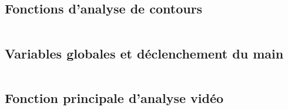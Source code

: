 \documentclass[12pt,a4paper,fleqn]{article}
\begin{document}
\subsection{Fonctions d'analyse de contours}
\inputminted[firstline=1,lastline=142]{python}{../find_ball_v6.py}
\subsection{Variables globales et déclenchement du main}
\inputminted[firstline=285,lastline=295]{python}{../find_ball_v6.py}
\newpage
\subsection{Fonction principale d'analyse vidéo}
\inputminted[firstline=146,lastline=282]{python}{../find_ball_v6.py}
\end{document}
